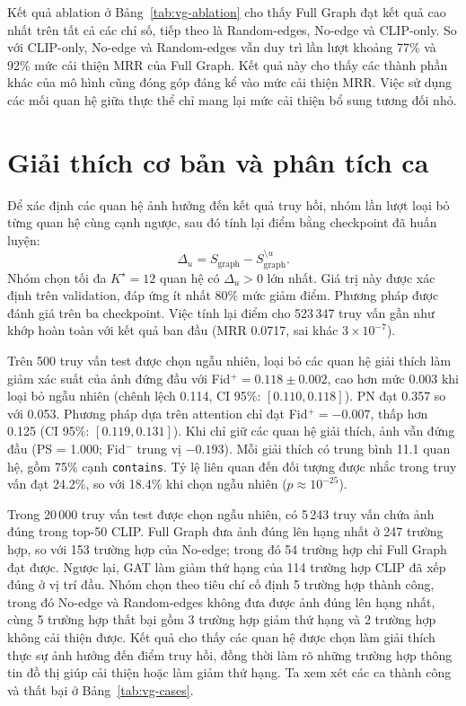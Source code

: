 Kết quả ablation ở Bảng~\ref{tab:vg-ablation} cho thấy Full Graph đạt kết quả cao nhất trên tất cả các chỉ số, tiếp theo là Random-edges, No-edge và CLIP-only. So với CLIP-only, No-edge và Random-edges vẫn duy trì
lần lượt khoảng 77\% và 92\% mức cải thiện MRR
của Full Graph. Kết quả này cho thấy các thành phần khác
của mô hình cũng đóng góp đáng kể vào mức cải thiện MRR. 
Việc sử dụng các mối quan hệ giữa thực thể chỉ mang lại mức cải thiện bổ sung tương đối nhỏ.

\section{Giải thích cơ bản và phân tích ca}
\label{sec:level1-xai-method}
\label{sec:level1-xai-results}

Để xác định các quan hệ ảnh hưởng đến kết quả truy hồi, nhóm lần lượt loại bỏ từng quan hệ cùng cạnh ngược, sau đó tính lại điểm bằng checkpoint đã huấn luyện:
\begin{equation}
\Delta_u = S_{\mathrm{graph}} - S_{\mathrm{graph}}^{\setminus u}.
\end{equation}
Nhóm chọn tối đa $K^\star=12$ quan hệ có $\Delta_u>0$ lớn nhất. Giá trị này được xác định trên validation, đáp ứng ít nhất 80\% mức giảm điểm. Phương pháp được đánh giá trên ba checkpoint. Việc tính lại điểm cho 523\,347 truy vấn gần như khớp hoàn toàn với kết quả ban đầu (MRR 0.0717, sai khác $3\times10^{-7}$). 

Trên 500 truy vấn test được chọn ngẫu nhiên, loại bỏ các quan hệ giải thích làm giảm xác suất của ảnh đứng đầu với Fid$^+=0.118\pm0.002$, cao hơn mức 0.003 khi loại bỏ ngẫu nhiên (chênh lệch 0.114, CI 95\%: $[0.110,0.118]$). PN đạt 0.357 so với 0.053. Phương pháp dựa trên attention chỉ đạt Fid$^+=-0.007$, thấp hơn 0.125 (CI 95\%: $[0.119,0.131]$). Khi chỉ giữ các quan hệ giải thích, ảnh vẫn đứng đầu (PS = 1.000; Fid$^-$ trung vị $-0.193$). Mỗi giải thích có trung bình 11.1 quan hệ, gồm 75\% cạnh \texttt{contains}. Tỷ lệ liên quan đến đối tượng được nhắc trong truy vấn đạt 24.2\%, so với 18.4\% khi chọn ngẫu nhiên ($p\approx10^{-25}$).

Trong 20\,000 truy vấn test được chọn ngẫu nhiên, có 5\,243 truy vấn chứa ảnh đúng trong top-50 CLIP. Full Graph đưa ảnh đúng lên hạng nhất ở 247 trường hợp, so với 153 trường hợp của No-edge; trong đó 54 trường hợp chỉ Full Graph đạt được. Ngược lại, GAT làm giảm thứ hạng của 114 trường hợp CLIP đã xếp đúng ở vị trí đầu. Nhóm chọn theo tiêu chí cố định 5 trường hợp thành công, trong đó No-edge và Random-edges không đưa được ảnh đúng lên hạng nhất, cùng 5 trường hợp thất bại gồm 3 trường hợp giảm thứ hạng và 2 trường hợp không cải thiện được. Kết quả cho thấy các quan hệ được chọn làm giải thích thực sự ảnh hưởng đến điểm truy hồi, đồng thời làm rõ những trường hợp thông tin đồ thị giúp cải thiện hoặc làm giảm thứ hạng. Ta xem xét các ca thành công và thất bại ở Bảng~\ref{tab:vg-cases}.

